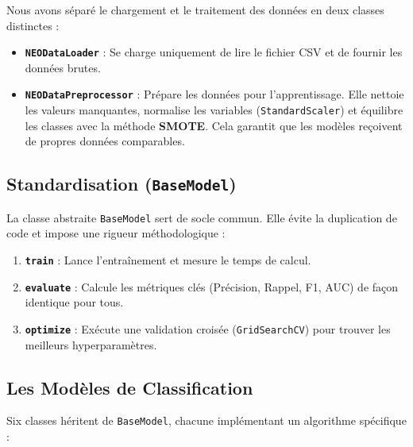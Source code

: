 \documentclass[11pt]{article}
\providecommand{\tightlist}{%
      \setlength{\itemsep}{0pt}\setlength{\parskip}{0pt}}
\begin{document}
Nous avons séparé le chargement et le traitement des données en deux
classes distinctes :

\begin{itemize}
  \tightlist
  \item
        \textbf{\texttt{NEODataLoader}} : Se charge uniquement de lire le
        fichier CSV et de fournir les données brutes.
  \item
        \textbf{\texttt{NEODataPreprocessor}} : Prépare les données pour
        l'apprentissage. Elle nettoie les valeurs manquantes, normalise les
        variables (\texttt{StandardScaler}) et équilibre les classes avec la
        méthode \textbf{SMOTE}. Cela garantit que les modèles reçoivent de
        propres données comparables.
\end{itemize}

\subsection{\texorpdfstring{Standardisation
    (\texttt{BaseModel})}{Standardisation (BaseModel)}}\label{standardisation-basemodel}

La classe abstraite \texttt{BaseModel} sert de socle commun. Elle évite
la duplication de code et impose une rigueur méthodologique :

\begin{enumerate}
  \def\labelenumi{\arabic{enumi}.}
  \tightlist
  \item
        \textbf{\texttt{train}} : Lance l'entraînement et mesure le temps de
        calcul.
  \item
        \textbf{\texttt{evaluate}} : Calcule les métriques clés (Précision,
        Rappel, F1, AUC) de façon identique pour tous.
  \item
        \textbf{\texttt{optimize}} : Exécute une validation croisée
        (\texttt{GridSearchCV}) pour trouver les meilleurs hyperparamètres.
\end{enumerate}

\subsection{Les Modèles de
  Classification}\label{les-moduxe8les-de-classification}

Six classes héritent de \texttt{BaseModel}, chacune implémentant un
algorithme spécifique :
\end{document}
